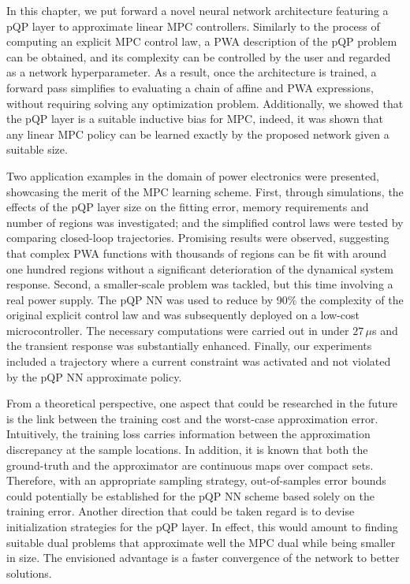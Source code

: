 In this chapter, we put forward a novel neural network architecture featuring a pQP layer to approximate linear MPC controllers. Similarly to the process of computing an explicit MPC control law, a PWA description of the pQP problem can be obtained, and its complexity can be controlled by the user and regarded as a network hyperparameter. As a result, once the architecture is trained, a forward pass simplifies to evaluating a chain of affine and PWA expressions, without requiring solving any optimization problem. Additionally, we showed that the pQP layer is a suitable inductive bias for MPC, indeed, it was shown that any linear MPC policy can be learned exactly by the proposed network given a suitable size.

Two application examples in the domain of power electronics were presented, showcasing the merit of the MPC learning scheme. First, through simulations, the effects of the pQP layer size on the fitting error, memory requirements and number of regions was investigated; and the simplified control laws were tested by comparing closed-loop trajectories. Promising results were observed, suggesting that complex PWA functions with thousands of regions can be fit with around one hundred regions without a significant deterioration of the dynamical system response. Second, a smaller-scale problem was tackled, but this time involving a real power supply. The pQP NN was used to reduce by 90\% the complexity of the original explicit control law and was subsequently deployed on a low-cost microcontroller. The necessary computations were carried out in under $27\,\mu$s and the transient response was substantially enhanced.  Finally, our experiments included a trajectory where a current constraint was activated and not violated by the pQP NN approximate policy.

From a theoretical perspective, one aspect that could be researched in the future is the link between the training cost and the worst-case approximation error. Intuitively, the training loss carries information between the approximation discrepancy at the sample locations. In addition, it is known that both the ground-truth and the approximator are continuous maps over compact sets. Therefore, with an appropriate sampling strategy, out-of-samples error bounds could potentially be established for the pQP NN scheme based solely on the training error. Another direction that could be taken regard is to devise initialization strategies for the pQP layer. In effect, this would amount to finding suitable dual problems that approximate well the MPC dual while being smaller in size. The envisioned advantage is a faster convergence of the network to better solutions.

